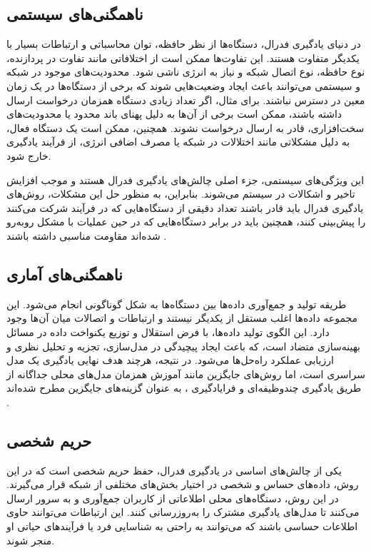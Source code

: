 \subsection{ناهمگنی‌های سیستمی}
در دنیای یادگیری فدرال، دستگاه‌ها از نظر حافظه، توان محاسباتی و ارتباطات بسیار با یکدیگر متفاوت هستند. این تفاوت‌ها ممکن است از اختلافاتی مانند تفاوت در پردازنده، نوع حافظه، نوع اتصال شبکه و نیاز به انرژی ناشی شود. محدودیت‌های موجود در شبکه و سیستمی می‌توانند باعث ایجاد وضعیت‌هایی شوند که برخی از دستگاه‌ها در یک زمان معین در دسترس نباشند. برای مثال، اگر تعداد زیادی دستگاه همزمان درخواست ارسال داشته باشند، ممکن است برخی از آن‌ها به دلیل پهنای باند محدود یا محدودیت‌های سخت‌افزاری، قادر به ارسال درخواست نشوند. همچنین، ممکن است یک دستگاه فعال، به دلیل مشکلاتی مانند اختلالات در شبکه یا مصرف اضافی انرژی، از فرآیند یادگیری خارج شود.

این ویژگی‌های سیستمی، جزء اصلی چالش‌های یادگیری فدرال هستند و موجب افزایش تاخیر و اشکالات در سیستم می‌شوند. بنابراین، به منظور حل این مشکلات، روش‌های یادگیری فدرال باید قادر باشند تعداد دقیقی از دستگاه‌هایی که در فرآیند شرکت می‌کنند را پیش‌بینی کنند، همچنین باید در برابر دستگاه‌هایی که در حین عملیات با مشکل روبه‌رو شده‌اند مقاومت مناسبی داشته باشند
\cite{li2020federated}.


\subsection{ناهمگنی‌های آماری}
 طریقه تولید و جمع‌آوری داده‌ها بین دستگاه‌ها به شکل گوناگونی انجام می‌شود. این مجموعه داده‌ها اغلب مستقل از یکدیگر نیستند و ارتباطات و اتصالات میان آن‌ها وجود دارد. این الگوی تولید داده‌ها، با فرض استقلال و توزیع یکنواخت داده%
  در مسائل بهینه‌سازی متضاد است، که باعث ایجاد پیچیدگی در مدل‌سازی، تجزیه و تحلیل نظری و ارزیابی عملکرد راه‌حل‌ها می‌شود. در نتیجه، هرچند هدف نهایی یادگیری یک مدل سراسری است، اما روش‌های جایگزین مانند آموزش همزمان مدل‌های محلی جداگانه از طریق یادگیری چندوظیفه‌ای%
  و فرایادگیری%
  ، به عنوان گزینه‌های جایگزین مطرح شده‌اند
   \cite{li2020federated}.
   
\subsection{حریم شخصی}
یکی از چالش‌های اساسی در یادگیری فدرال، حفظ حریم شخصی است که در این روش، داده‌های حساس و شخصی در اختیار بخش‌های مختلفی از شبکه قرار می‌گیرند. در این روش، دستگاه‌های محلی اطلاعاتی از کاربران جمع‌آوری و به سرور ارسال می‌کنند تا مدل‌های یادگیری مشترک را به‌روزرسانی کنند. این ارتباطات می‌توانند حاوی اطلاعات حساسی باشند که می‌توانند به راحتی به شناسایی فرد یا فرآیندهای حیاتی او منجر شوند.

